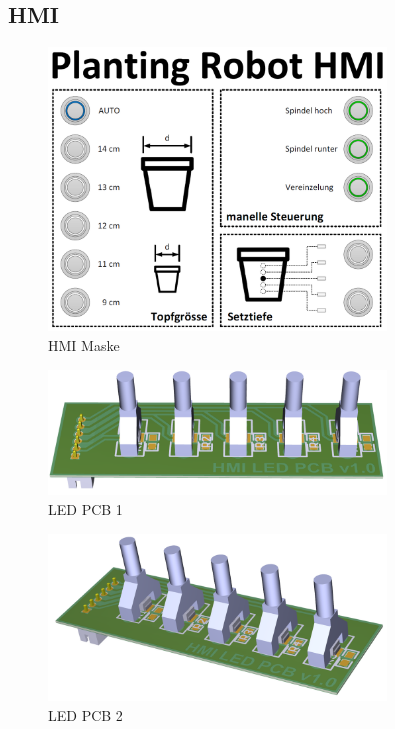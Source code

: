 \subsection{HMI} 
\label{sec:HMI}

\begin{figure}[H]
	\includegraphics[width=0.8\textwidth]{Illustrationen/6-Umsetzung/HMI_Maske.png}
	\caption{HMI Maske}
	\label{fig:HMI_Maske}
\end{figure}

\begin{figure}[H]
	\includegraphics[width=0.8\textwidth]{Illustrationen/6-Umsetzung/LED_PCB_3D.png}
	\caption{LED PCB 1}
	\label{fig:LED_PCB_1}
\end{figure}

\begin{figure}[H]
	\includegraphics[width=0.8\textwidth]{Illustrationen/6-Umsetzung/LED_PCB_3D_2.png}
	\caption{LED PCB 2}
	\label{fig:LED_PCB_2}
\end{figure}